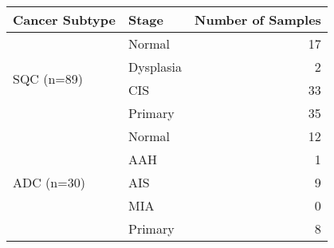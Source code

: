 \begin{tabular}{l|lr}
Cancer Subtype & Stage & Number of Samples \\ \hline
\multirow{4}{*}{SQC (n=89)} & Normal & 17 \\
 & Dysplasia & 2 \\
 & CIS & 33 \\
 & Primary & 35 \\ \hline
\multirow{5}{*}{ADC (n=30)} & Normal & 12 \\
 & AAH & 1 \\
 & AIS & 9 \\
 & MIA & 0 \\
 & Primary & 8
\end{tabular}
